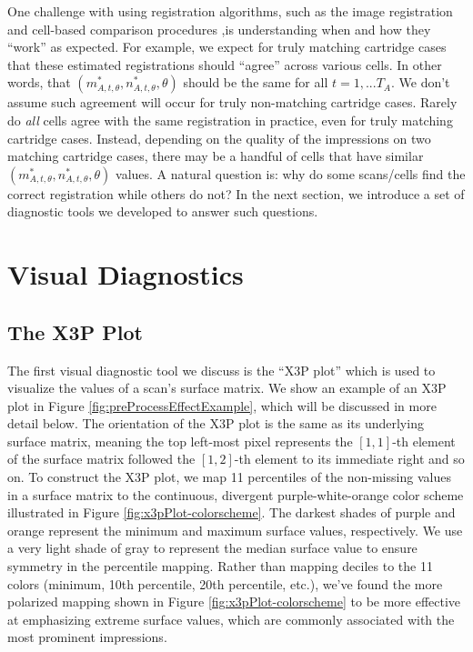 \documentclass[11pt,]{isuthesis}
\begin{document}
One challenge with using registration algorithms, such as the image registration and cell-based comparison procedures ,is understanding when and how they ``work'' as expected.
For example, we expect for truly matching cartridge cases that these estimated registrations should ``agree'' across various cells.
In other words, that \((m^*_{A,t,\theta},n^*_{A,t,\theta}, \theta)\) should be the same for all \(t = 1,...T_A\).
We don't assume such agreement will occur for truly non-matching cartridge cases.
Rarely do \emph{all} cells agree with the same registration in practice, even for truly matching cartridge cases.
Instead, depending on the quality of the impressions on two matching cartridge cases, there may be a handful of cells that have similar \((m^*_{A,t,\theta},n^*_{A,t,\theta}, \theta)\) values.
A natural question is: why do some scans/cells find the correct registration while others do not?
In the next section, we introduce a set of diagnostic tools we developed to answer such questions.

\hypertarget{visual-diagnostics-1}{%
\section{Visual Diagnostics}\label{visual-diagnostics-1}}

\hypertarget{the-x3p-plot}{%
\subsection{The X3P Plot}\label{the-x3p-plot}}

The first visual diagnostic tool we discuss is the ``X3P plot'' which is used to visualize the values of a scan's surface matrix.
We show an example of an X3P plot in Figure \ref{fig:preProcessEffectExample}, which will be discussed in more detail below.
The orientation of the X3P plot is the same as its underlying surface matrix, meaning the top left-most pixel represents the \([1,1]\)-th element of the surface matrix followed the \([1,2]\)-th element to its immediate right and so on.
To construct the X3P plot, we map 11 percentiles of the non-missing values in a surface matrix to the continuous, divergent purple-white-orange color scheme illustrated in Figure \ref{fig:x3pPlot-colorscheme}.
The darkest shades of purple and orange represent the minimum and maximum surface values, respectively.
We use a very light shade of gray to represent the median surface value to ensure symmetry in the percentile mapping.
Rather than mapping deciles to the 11 colors (minimum, 10th percentile, 20th percentile, etc.), we've found the more polarized mapping shown in Figure \ref{fig:x3pPlot-colorscheme} to be more effective at emphasizing extreme surface values, which are commonly associated with the most prominent impressions.
\end{document}
